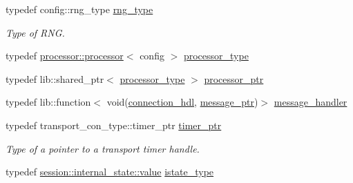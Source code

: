 \begin{DoxyCompactItemize}
\item 
typedef config\+::rng\+\_\+type \hyperlink{classwebsocketpp_1_1connection_afc276f2f61d5b1acfadc64f91b3f89e5}{rng\+\_\+type}
\begin{DoxyCompactList}\small\item\em Type of R\+N\+G. \end{DoxyCompactList}\item 
typedef \hyperlink{classwebsocketpp_1_1processor_1_1processor}{processor\+::processor}$<$ config $>$ \hyperlink{classwebsocketpp_1_1connection_a77cd1bb26e05961a5fbc60708244d1fe}{processor\+\_\+type}
\item 
typedef lib\+::shared\+\_\+ptr$<$ \hyperlink{classwebsocketpp_1_1connection_a77cd1bb26e05961a5fbc60708244d1fe}{processor\+\_\+type} $>$ \hyperlink{classwebsocketpp_1_1connection_a7e955b2fc98102bb3776e993f95c9009}{processor\+\_\+ptr}
\item 
typedef lib\+::function$<$ void(\hyperlink{namespacewebsocketpp_a6b3d26a10ee7229b84b776786332631d}{connection\+\_\+hdl}, \hyperlink{classwebsocketpp_1_1connection_a3b98c091caf54540024538d2394ffb57}{message\+\_\+ptr})$>$ \hyperlink{classwebsocketpp_1_1connection_a0091551000546d5f5f427379d852cae9}{message\+\_\+handler}
\item 
typedef transport\+\_\+con\+\_\+type\+::timer\+\_\+ptr \hyperlink{classwebsocketpp_1_1connection_aa13510ba1841ded8492a0483a294feb0}{timer\+\_\+ptr}
\begin{DoxyCompactList}\small\item\em Type of a pointer to a transport timer handle. \end{DoxyCompactList}\item 
typedef \hyperlink{namespacewebsocketpp_1_1session_1_1internal__state_a981c3a4fb8962bad264d7efea05c508d}{session\+::internal\+\_\+state\+::value} \hyperlink{classwebsocketpp_1_1connection_ab22544fdc49d7f332cd1abba9fefd814}{istate\+\_\+type}
\end{DoxyCompactItemize}
